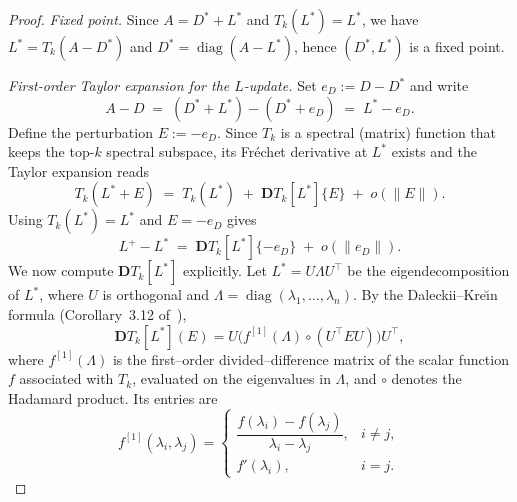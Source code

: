 \documentclass[final,hidelinks,onefignum,onetabnum]{siamart250211}
\providecommand{\1}{\mathbf{1}}
\theoremstyle{plain}
\begin{document}
\begin{proof}
\emph{Fixed point.}
Since $A=D^*+L^*$ and $T_k(L^*)=L^*$, we have $L^*=T_k(A-D^*)$ and $D^*=\operatorname{diag}(A-L^*)$, hence $(D^*,L^*)$ is a fixed point.

\smallskip
\emph{First-order Taylor expansion for the $L$-update.}
Set $e_D:=D-D^*$ and write
\[
A-D \;=\; (D^*+L^*)-(D^*+e_D) \;=\; L^* - e_D.
\]
Define the perturbation $E:=-e_D$. Since $T_k$ is a spectral (matrix) function that keeps the top-$k$ spectral subspace, its Fr\'echet derivative at $L^*$ exists and the Taylor expansion reads
\[
T_k(L^*+E)
\;=\;T_k(L^*)\;+\;\mathbf{D}T_k[L^*]\{E\}\;+\;o(\|E\|).
\]
Using $T_k(L^*)=L^*$ and $E=-e_D$ gives
\begin{equation} \label{e:taylorLstar}
    L^+ - L^* \;=\; \mathbf{D}T_k[L^*]\{-e_D\} \;+\; o(\|e_D\|).
\end{equation}
We now compute $\mathbf{D}T_k[L^*]$ explicitly.  
Let $L^*=U\Lambda U^\top$ be the eigendecomposition of $L^*$, where $U$ is orthogonal and
$\Lambda=\operatorname{diag}(\lambda_1,\ldots,\lambda_n)$.  
By the Daleckii--Kre\u{\i}n formula (Corollary~3.12 of~\cite{higham2008functions}),
\begin{equation}
\label{eq:dk-collapse}
\mathbf{D}T_k[L^*](E)
=
U\bigl(f^{[1]}(\Lambda)\circ(U^\top E U)\bigr)U^\top,
\end{equation}
where $f^{[1]}(\Lambda)$ is the first–order divided–difference matrix of the scalar function $f$
associated with $T_k$, evaluated on the eigenvalues in $\Lambda$, and $\circ$ denotes the Hadamard
product.  Its entries are
\[
f^{[1]}(\lambda_i,\lambda_j)
=
\begin{cases}
\dfrac{f(\lambda_i)-f(\lambda_j)}{\lambda_i-\lambda_j}, & i\neq j,\\[6pt]
f'(\lambda_i), & i=j.
\end{cases}
\]







\end{proof}
\end{document}
